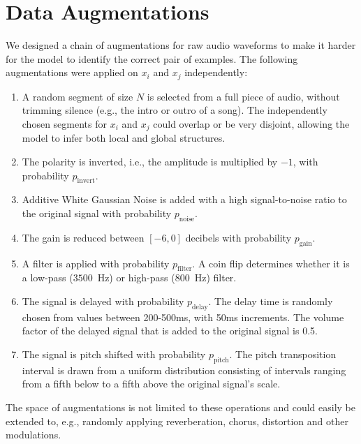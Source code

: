 \section{Data Augmentations}
We designed a chain of augmentations for raw audio waveforms to make it harder for the model to identify the correct pair of examples. The following augmentations were applied on ${x_i}$ and ${x_j}$ independently:
\begin{enumerate}
    \item A random segment of size $N$ is selected from a full piece of audio, without trimming silence (e.g., the intro or outro of a song). The independently chosen segments for $x_i$ and $x_j$ could overlap or be very disjoint, allowing the model to infer both local and global structures.
    \item The polarity is inverted, i.e., the amplitude is multiplied by $-1$, with probability $p_{\mathrm{invert}}$.
    \item Additive White Gaussian Noise is added with a high signal-to-noise ratio to the original signal with probability $p_{\mathrm{noise}}$.
    \item The gain is reduced between $[-6, 0]$ decibels with probability $p_{\mathrm{gain}}$.
    \item A filter is applied with probability $p_{\mathrm{filter}}$. A coin flip determines whether it is a low-pass ($3500$~Hz) or high-pass ($800$~Hz) filter.
    \item The signal is delayed with probability $p_{\mathrm{delay}}$. The delay time is randomly chosen from values between 200-500ms, with 50ms increments. The volume factor of the delayed signal that is added to the original signal is 0.5.
    \item The signal is pitch shifted with probability $p_{\mathrm{pitch}}$. The pitch transposition interval is drawn from a uniform distribution consisting of intervals ranging from a fifth below to a fifth above the original signal's scale.
\end{enumerate}
The space of augmentations is not limited to these operations and could easily be extended to, e.g., randomly applying reverberation, chorus, distortion and other modulations.


